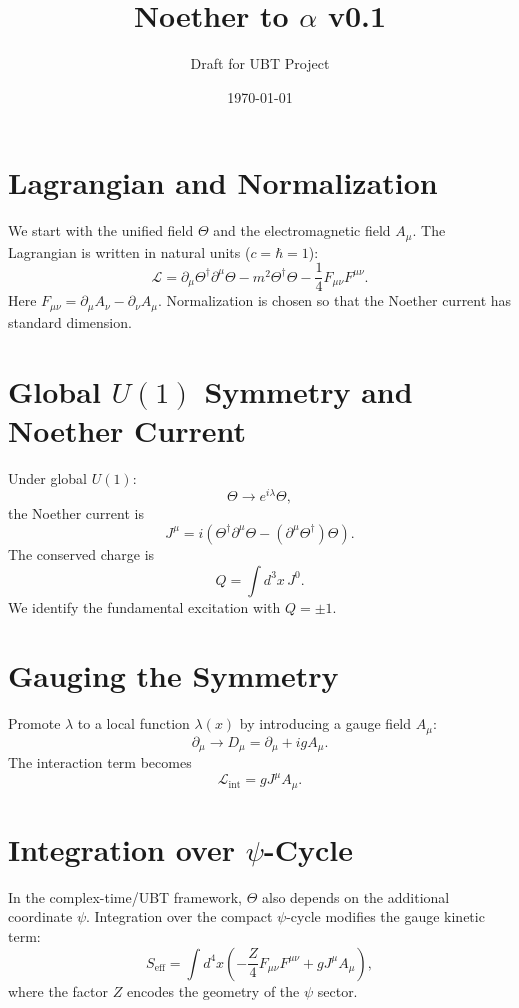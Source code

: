 \documentclass[12pt]{article}
\title{Noether to $\alpha$ v0.1}
\author{Draft for UBT Project}
\date{\today}
\begin{document}
\maketitle

\section{Lagrangian and Normalization}
We start with the unified field $\Theta$ and the electromagnetic field $A_\mu$.
The Lagrangian is written in natural units ($c=\hbar=1$):
\begin{equation}
\mathcal{L} = \partial_\mu \Theta^\dagger \partial^\mu \Theta 
 - m^2 \Theta^\dagger \Theta - \frac{1}{4} F_{\mu\nu}F^{\mu\nu}.
\end{equation}
Here $F_{\mu\nu} = \partial_\mu A_\nu - \partial_\nu A_\mu$. 
Normalization is chosen so that the Noether current has standard dimension.

\section{Global $U(1)$ Symmetry and Noether Current}
Under global $U(1)$:
\begin{equation}
\Theta \to e^{i\lambda} \Theta,
\end{equation}
the Noether current is
\begin{equation}
J^\mu = i \left( \Theta^\dagger \partial^\mu \Theta - (\partial^\mu \Theta^\dagger)\Theta \right).
\end{equation}
The conserved charge is
\begin{equation}
Q = \int d^3x\, J^0.
\end{equation}
We identify the fundamental excitation with $Q=\pm 1$.

\section{Gauging the Symmetry}
Promote $\lambda$ to a local function $\lambda(x)$ by introducing a gauge field $A_\mu$:
\begin{equation}
\partial_\mu \to D_\mu = \partial_\mu + i g A_\mu.
\end{equation}
The interaction term becomes
\begin{equation}
\mathcal{L}_{\text{int}} = g J^\mu A_\mu.
\end{equation}

\section{Integration over $\psi$-Cycle}
In the complex-time/UBT framework, $\Theta$ also depends on the additional coordinate $\psi$.
Integration over the compact $\psi$-cycle modifies the gauge kinetic term:
\begin{equation}
S_{\text{eff}} = \int d^4x \left( - \frac{Z}{4} F_{\mu\nu}F^{\mu\nu} + g J^\mu A_\mu \right),
\end{equation}
where the factor $Z$ encodes the geometry of the $\psi$ sector.
\end{document}

